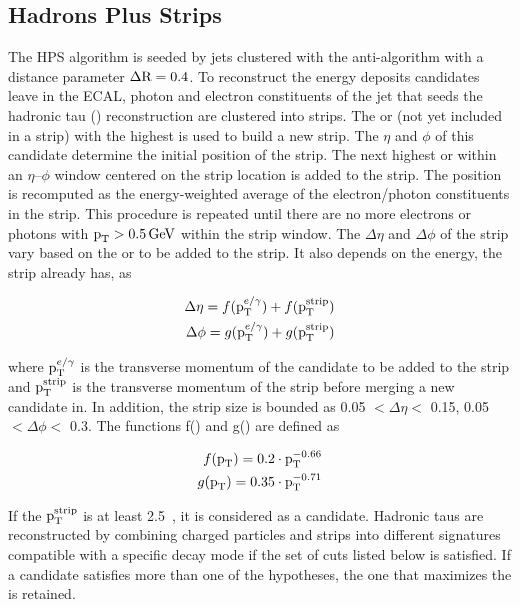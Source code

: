 \subsection{Hadrons Plus Strips}

The HPS algorithm is seeded by jets clustered with the anti-\kt algorithm with a distance parameter $\Delta \text{R} = 0.4$. To reconstruct the energy deposits \Pgpz candidates leave in the ECAL, photon and electron constituents of the jet that seeds the hadronic tau (\tauh) reconstruction are clustered into strips. The \Pe or \Pgg (not yet included in a strip) with the highest \pt is used to build a new strip. The $\eta$ and $\phi$ of this candidate determine the initial position of the strip. The next highest \pt \Pe or \Pgg within an $\eta$--$\phi$ window centered on the strip location is added to the strip. The position is recomputed as the energy-weighted average of the electron/photon constituents in the strip. This procedure is repeated until there are no more electrons or photons with $\text{p}_\text{T} > 0.5 \,\text{Ge\hspace{-.08em}V}$ within the strip window. The $\Delta \eta $ and $\Delta \phi $ of the strip vary based on the \pt or \ET to be added to the strip. It also depends on the energy, the strip already has, as
\begin{linenomath*}
  \begin{equation*}
    \begin{aligned}
      \Delta \eta = f(\text{p}_\text{T}^{e/\gamma}) + f(\text{p}_\text{T}^{\text{strip}}) \\
      \Delta \phi = g(\text{p}_\text{T}^{e/\gamma}) + g(\text{p}_\text{T}^{\text{strip}})
    \end{aligned}
  \end{equation*}
\end{linenomath*}
where $\text{p}_\text{T}^{e/\gamma}$ is the transverse momentum of the candidate to be added to the strip and $\text{p}_\text{T}^{\text{strip}}$ is the transverse momentum of the strip before merging a new candidate in. In addition, the strip size is bounded as 0.05 $< \Delta\eta <$ 0.15, 0.05 $< \Delta\phi <$ 0.3. The functions f(\pt) and g(\pt) are defined as
\begin{linenomath*}
  \begin{equation*}
    \begin{aligned}
      f(\text{p}_\text{T}) = 0.2 \cdot \text{p}_\text{T}^{-0.66} \\
      g(\text{p}_\text{T}) = 0.35 \cdot \text{p}_\text{T}^{-0.71}
    \end{aligned}
  \end{equation*}
\end{linenomath*}

If the $\text{p}_\text{T}^{\text{strip}}$ is at least 2.5~\GeV, it is considered as a \Pgpz candidate. Hadronic taus are reconstructed by combining charged particles and strips into different signatures compatible with a specific decay mode if the set of cuts listed below is satisfied. If a candidate satisfies more than one of the hypotheses, the one that maximizes the \pt is retained.

